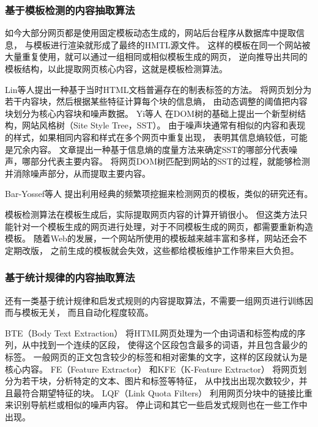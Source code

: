 \subsubsection{基于模板检测的内容抽取算法}

如今大部分网页都是使用固定模板动态生成的，网站后台程序从数据库中提取信息，
与模板进行渲染就形成了最终的HMTL源文件。
这样的模板在同一个网站被大量重复使用，就可以通过一组相同或相似模板生成的网页，
逆向推导出共同的模板结构，以此提取网页核心内容，这就是模板检测算法。

Lin等人提出一种基于当时HTML文档普遍存在的制表标签的方法。
将网页划分为若干内容块，然后根据某些特征计算每个块的信息熵，
由动态调整的阈值把内容块划分为核心内容块和噪声数据。
Yi等人
在DOM树的基础上提出一个新型树结构，网站风格树（Site Style Tree，SST）。
由于噪声块通常有相似的内容和表现的样式，如果相同内容和样式在多个网页中重复出现，
表明其信息熵较低，可能是冗余内容。
文章提出一种基于信息熵的度量方法来确定SST的哪部分代表噪声，哪部分代表主要内容。
将网页DOM树匹配到网站的SST的过程，就能够检测并消除噪声部分，从而提取主要内容。

Bar-Yossef等人
提出利用经典的频繁项挖掘来检测网页的模板，类似的研究还有\cite{chen2006template}。

模板检测算法在模板生成后，实际提取网页内容的计算开销很小。
但这类方法只能针对一个模板生成的网页进行处理，对于不同模板生成的网页，都需要重新构造模板。
随着Web的发展，一个网站所使用的模板越来越丰富和多样，网站还会不定期改版，
之前生成的模板就会失效，这些都给模板维护工作带来巨大负担。

\subsubsection{基于统计规律的内容抽取算法}

还有一类基于统计规律和启发式规则的内容提取算法，不需要一组网页进行训练因而与模板无关，
而且自动化程度较高。

BTE（Body Text Extraction）
将HTML网页处理为一个由词语和标签构成的序列，从中找到一个连续的区段，
使得这个区段包含最多的词语，并且包含最少的标签。
一般网页的正文包含较少的标签和相对密集的文字，这样的区段就认为是核心内容。
FE（Feature Extractor）
和KFE（K-Feature Extractor）
将网页划分为若干块，分析特定的文本、图片和标签等特征，
从中找出出现次数较少，并且最符合期望特征的块。
LQF（Link Quota Filters）
利用网页分块中的链接比重来识别导航栏或相似的噪声内容。
停止词和其它一些启发式规则也在一些工作中出现。

